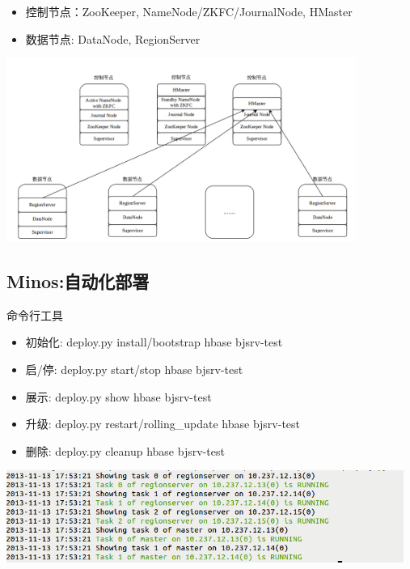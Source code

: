 \documentclass[xcolor=table]{beamer}
\begin{document}
\begin{CJK}{UTF8}{gkai}
\begin{frame}{\subsecname}
\begin{itemize}
\item 控制节点：ZooKeeper, NameNode/ZKFC/JournalNode, HMaster
\item 数据节点: DataNode, RegionServer
\end{itemize}
\includegraphics[width=\textwidth, height=6cm]{hbase-init.png}
\end{frame}

\subsection{Minos:自动化部署}
\begin{frame}{\subsecname}
	命令行工具
	\begin{itemize}
	\item 初始化: deploy.py install/bootstrap hbase bjsrv-test
	\item 启/停: deploy.py start/stop hbase bjsrv-test	
	\item 展示: deploy.py show hbase bjsrv-test	
	\item 升级: deploy.py restart/rolling\_update hbase bjsrv-test	
	\item 删除: deploy.py cleanup hbase bjsrv-test	
	\end{itemize}
	\includegraphics[width=\textwidth, height=3cm]{deploy-show.png}
\end{frame}


\end{CJK}
\end{document}

